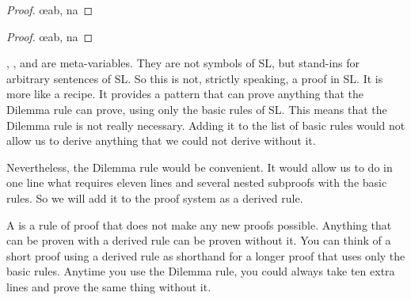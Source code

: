 \begin{proof}
	\open
		\open
		\close
		\open
		\close
		\oe{ab, na}
	\close
	 
\end{proof}

\begin{proof}
	\open
		\open
		\close
		\open
		\close
		\oe{ab, na}
	\close
	 
\end{proof}



, , and  are meta-variables. They are not symbols of SL, but stand-ins for arbitrary sentences of SL. So this is not, strictly speaking, a proof in SL. It is more like a recipe. It provides a pattern that can prove anything that the Dilemma rule can prove, using only the basic rules of SL. This means that the Dilemma rule is not really necessary. Adding it to the list of basic rules would not allow us to derive anything that we could not derive without it.

Nevertheless, the Dilemma rule would be convenient. It would allow us to do in one line what requires eleven lines and several nested subproofs with the basic rules. So we will add it to the proof system as a derived rule.

A  is a rule of proof that does not make any new proofs possible. Anything that can be proven with a derived rule can be proven without it. You can think of a short proof using a derived rule as shorthand for a longer proof that uses only the basic rules. Anytime you use the Dilemma rule, you could always take ten extra lines and prove the same thing without it.

